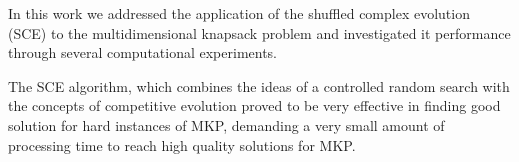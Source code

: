 In this work we addressed the application of the shuffled complex
evolution (SCE) to the multidimensional knapsack problem and investigated it
performance through several computational experiments.

The SCE algorithm, which combines the ideas of a controlled random search with
the concepts of competitive evolution proved to be very effective in finding
good solution for hard instances of MKP, demanding a very small amount of
processing time to reach high quality solutions for MKP.
